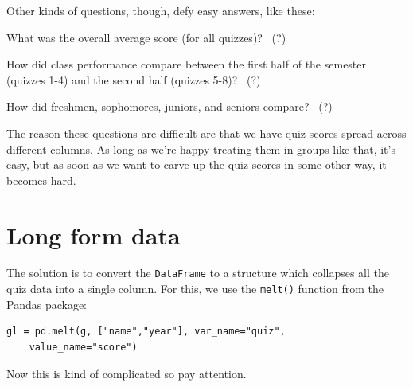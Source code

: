 \smallskip
Other kinds of questions, though, defy easy answers, like these:

\begin{compactitem}
\small
\item[\leftthumbsdown] What was the overall average score (for all quizzes)? \ (?)
\item[\leftthumbsdown] How did class performance compare between the first half
of the semester (quizzes 1-4) and the second half (quizzes 5-8)? \ (?)
\item[\leftthumbsdown] How did freshmen, sophomores, juniors, and seniors
compare? \ (?)
\end{compactitem}

The reason these questions are difficult are that we have quiz scores spread
across different columns. As long as we're happy treating them in groups like
that, it's easy, but as soon as we want to carve up the quiz scores in some
other way, it becomes hard.


\section{Long form data}


The solution is to convert the \texttt{DataFrame} to a structure which
collapses all the quiz data into a single column. For this, we use the
\texttt{melt()} function from the Pandas package:

\begin{Verbatim}[fontsize=\small,samepage=true,frame=single,framesep=3mm]
gl = pd.melt(g, ["name","year"], var_name="quiz",
    value_name="score")
\end{Verbatim}

Now this is kind of complicated so pay attention. 



